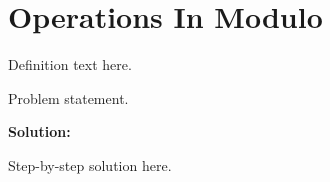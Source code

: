 \section{Operations In Modulo}


\begin{definition}[Term]
Definition text here.
\end{definition}

\begin{example}
Problem statement.

\textbf{Solution:}

Step-by-step solution here.
\end{example}
